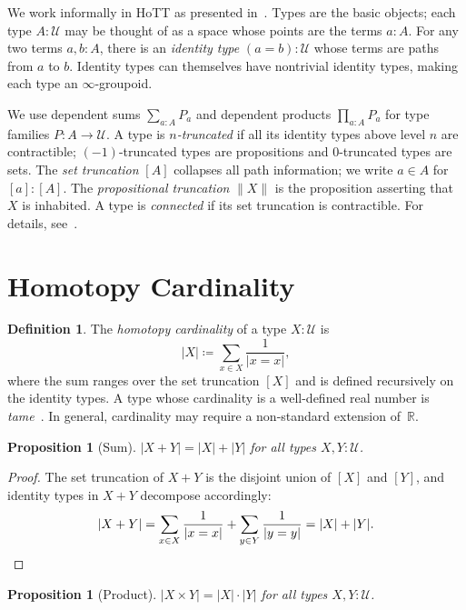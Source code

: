 \documentclass[12pt]{amsart}
\newcommand{\U}{\mathcal{U}}
\newcommand{\Rls}{\mathbb{R}}
\theoremstyle{plain}
\newtheorem{proposition}[theorem]{Proposition}
\theoremstyle{definition}
\newtheorem{definition}[theorem]{Definition}
\theoremstyle{remark}
\begin{document}
We work informally in HoTT as presented in~\cite{hottbook}. Types are the basic objects; each type $A:\U$ may be thought of as a space whose points are the terms $a:A$. For any two terms $a,b:A$, there is an \emph{identity type} $(a=b):\U$ whose terms are paths from $a$ to $b$. Identity types can themselves have nontrivial identity types, making each type an $\infty$-groupoid.

We use dependent sums $\sum_{a:A}P_a$ and dependent products $\prod_{a:A}P_a$ for type families $P:A\to\U$. A type is \emph{$n$-truncated} if all its identity types above level $n$ are contractible; $(-1)$-truncated types are propositions and $0$-truncated types are sets. The \emph{set truncation} $[A]$ collapses all path information; we write $a\in A$ for $[a]:[A]$. The \emph{propositional truncation} $\|X\|$ is the proposition asserting that $X$ is inhabited. A type is \emph{connected} if its set truncation is contractible. For details, see~\cite{hottbook,rijke2022introduction}.

\section{Homotopy Cardinality}\label{sec:cardinality}

\begin{definition}\label{def:cardinality}
The \emph{homotopy cardinality} of a type $X:\U$ is
\[
|X| \coloneqq \sum_{x\in X}\frac{1}{|x=x|},
\]
where the sum ranges over the set truncation $[X]$ and is defined recursively on the identity types. A type whose cardinality is a well-defined real number is \emph{tame}~\cite{baez2001finite,baez2008groupoidification}. In general, cardinality may require a non-standard extension of~$\Rls$.
\end{definition}

\begin{proposition}[Sum]\label{prop:sum}
$|X+Y| = |X|+|Y|$ for all types $X,Y:\U$.
\end{proposition}

\begin{proof}
The set truncation of $X+Y$ is the disjoint union of $[X]$ and $[Y]$, and identity types in $X+Y$ decompose accordingly:
\[
|X+Y| = \sum_{x\in X}\frac{1}{|x=x|} + \sum_{y\in Y}\frac{1}{|y=y|} = |X|+|Y|.\qedhere
\]
\end{proof}

\begin{proposition}[Product]\label{prop:product}
$|X\times Y| = |X|\cdot|Y|$ for all types $X,Y:\U$.
\end{proposition}
\end{document}
